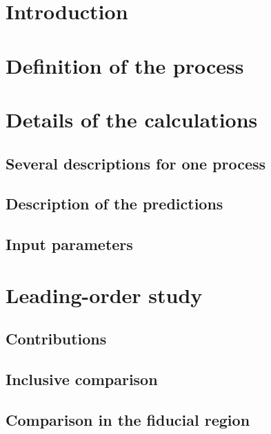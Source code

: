 \documentclass[twocolumn,epjc3]{svjour3} %
\begin{document}
\maketitle



\section{Introduction}


\section{Definition of the process}
    \label{sec:definition}
    

\section{Details of the calculations}
    \label{sec:details}
    \subsection{Several descriptions for one process}
        
    \subsection{Description of the predictions}
        \label{subsec:codedescr}
        
    \subsection{Input parameters}
        \label{subsec:inputpar}
        

\section{Leading-order study}
    \label{sec:LO}
    \subsection{Contributions}
        \label{subsec:contributions}
        
    \subsection{Inclusive comparison}
        \label{subsec:LOinclusive}
        
    \subsection{Comparison in the fiducial region}
        \label{subsec:LOfiducial}
        
        
\end{document}
